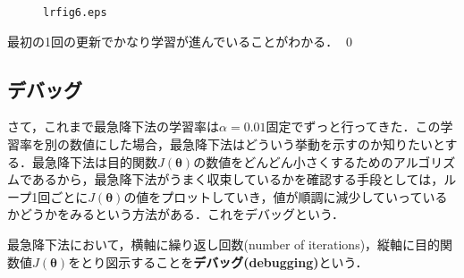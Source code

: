 \begin{ans}
\begin{cod}[\texttt{lr9.py}]
\begin{figure}[H]
\begin{center}
\vspace{-10pt}
\caption{\texttt{lrfig6.eps}}
\endframed
\end{center}
\end{figure}
\end{cod}
最初の1回の更新でかなり学習が進んでいることがわかる．
\qed	
\end{ans}

\subsection{デバッグ}

さて，これまで最急降下法の学習率は$\alpha=0.01$固定でずっと行ってきた．この学習率を別の数値にした場合，最急降下法はどういう挙動を示すのか知りたいとする．最急降下法は目的関数$J({\bm \theta})$の数値をどんどん小さくするためのアルゴリズムであるから，最急降下法がうまく収束しているかを確認する手段としては，ループ1回ごとに$J({\bm \theta})$の値をプロットしていき，値が順調に減少していっているかどうかをみるという方法がある．これをデバッグという．

\begin{defi}[デバッグ]
最急降下法において，横軸に繰り返し回数(number of iterations)，縦軸に目的関数値$J({\bm \theta})$をとり図示することを{\bf デバッグ(debugging)}という．
\end{defi}

